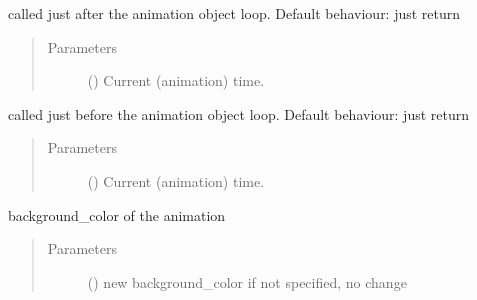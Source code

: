 \documentclass[letterpaper,10pt,english]{sphinxmanual}
\begin{document}
\begin{fulllineitems}
\begin{fulllineitems}
\label{\detokenize{Reference:salabim.Environment.animation_post_tick}}
called just after the animation object loop. 
Default behaviour: just return
\begin{quote}\begin{description}
\item[{Parameters}] \leavevmode
{} () \textendash{} Current (animation) time.

\end{description}\end{quote}

\end{fulllineitems}


\begin{fulllineitems}
\label{\detokenize{Reference:salabim.Environment.animation_pre_tick}}
called just before the animation object loop. 
Default behaviour: just return
\begin{quote}\begin{description}
\item[{Parameters}] \leavevmode
{} () \textendash{} Current (animation) time.

\end{description}\end{quote}

\end{fulllineitems}


\begin{fulllineitems}
\label{\detokenize{Reference:salabim.Environment.background_color}}
background\_color of the animation
\begin{quote}\begin{description}
\item[{Parameters}] \leavevmode
{} () \textendash{} new background\_color 
if not specified, no change


\end{description}
\end{quote}
\end{fulllineitems}
\end{fulllineitems}
\end{document}
